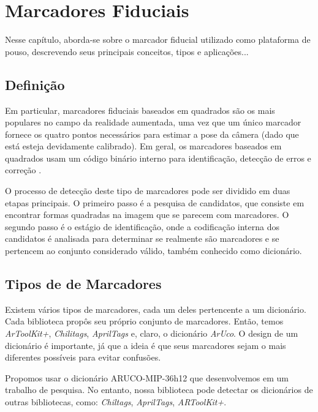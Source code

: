 \chapter{Marcadores Fiduciais}

    Nesse capítulo, aborda-se sobre o marcador fiducial utilizado como plataforma de pouso, descrevendo seus principais conceitos, tipos e aplicações...

\section{Definição}

Em particular, marcadores fiduciais baseados em quadrados são os mais populares no campo da realidade aumentada, uma vez que um único marcador fornece os quatro pontos necessários para estimar a pose da câmera (dado que está esteja devidamente calibrado). Em geral, os marcadores baseados em quadrados usam um código binário interno para identificação, detecção de erros e correção \cite{Ramirez2018}.

O processo de detecção deste tipo de marcadores pode ser dividido em duas etapas principais. O primeiro passo é a pesquisa de candidatos, que consiste em encontrar formas quadradas na imagem que se parecem com marcadores. O segundo passo é o estágio de identificação, onde a codificação interna dos candidatos é analisada para determinar se realmente são marcadores e se pertencem ao conjunto considerado válido, também conhecido como dicionário.

\section{Tipos de de Marcadores}

Existem vários tipos de marcadores, cada um deles pertencente a um dicionário. Cada biblioteca propôs seu próprio conjunto de marcadores. Então, temos \textit{ArToolKit+}, \textit{Chilitags}, \textit{AprilTags} e, claro, o dicionário \textit{ArUco}. O design de um dicionário é importante, já que a ideia é que seus marcadores sejam o mais diferentes possíveis para evitar confusões. 


Propomos usar o dicionário ARUCO-MIP-36h12 que desenvolvemos em um trabalho de pesquisa. No entanto, nossa biblioteca pode detectar os dicionários de outras bibliotecas, como: \textit{Chiltags}, \textit{AprilTags}, \textit{ARToolKit+}.

